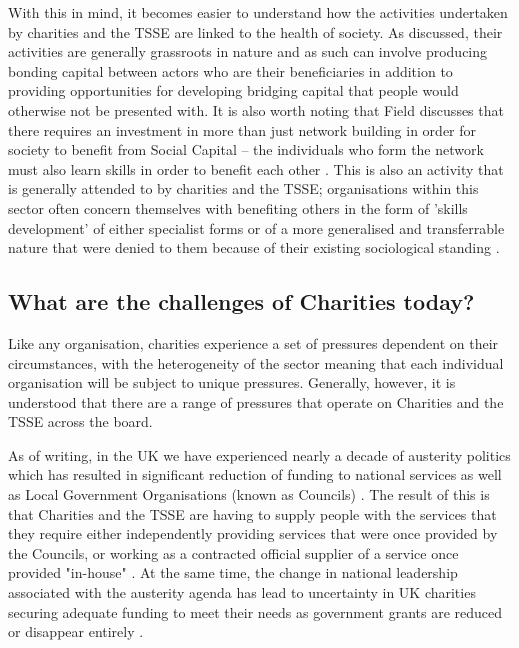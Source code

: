 With this in mind, it becomes easier to understand how the activities undertaken by charities and the TSSE are linked to the health of society. As discussed, their activities are generally grassroots in nature and as such can involve producing bonding capital between actors who are their beneficiaries in addition to providing opportunities for developing bridging capital that people would otherwise not be presented with. It is also worth noting that Field discusses that there requires an investment in more than just network building in order for society to benefit from Social Capital -- the individuals who form the network must also learn skills in order to benefit each other \cite{field_social_2003}. This is also an activity that is generally attended to by charities and the TSSE; organisations within this sector often concern themselves with benefiting others in the form of 'skills development' of either specialist forms or of a more generalised and transferrable nature that were denied to them because of their existing sociological standing .

\subsection{What are the challenges of Charities today?}
Like any organisation, charities experience a set of pressures dependent on their circumstances, with the heterogeneity of the sector meaning that each individual organisation will be subject to unique pressures. Generally, however, it is understood that there are a range of pressures that operate on Charities and the TSSE across the board.

As of writing, in the UK we have experienced nearly a decade of austerity politics which has resulted in significant reduction of funding to national services as well as Local Government Organisations (known as Councils) . The result of this is that Charities and the TSSE are having to supply people with the services that they require either independently providing services that were once provided by the Councils, or working as a contracted official supplier of a service once provided "in-house" . At the same time, the change in national leadership associated with the austerity agenda has lead to uncertainty in UK charities securing adequate funding to meet their needs as government grants are reduced or disappear entirely .

